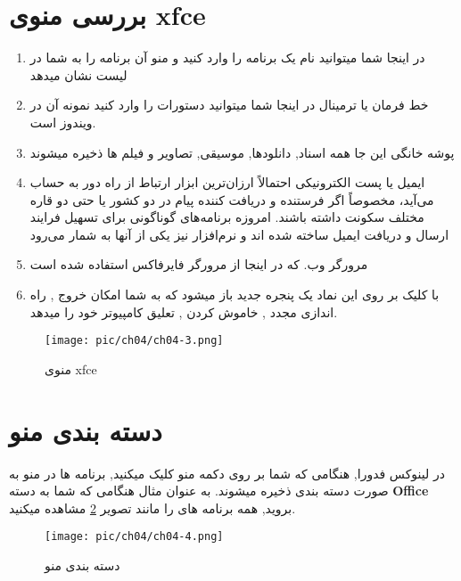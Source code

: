 \section{بررسی منوی xfce}\label{se-33}
\begin{enumerate}
	\item در اینجا شما میتوانید نام یک برنامه را وارد کنید و منو آن برنامه را به شما در لیست نشان میدهد
	\item خط فرمان یا ترمینال در اینجا شما میتوانید دستورات را وارد کنید نمونه آن در ویندوز
	است.
	\item پوشه خانگی این جا همه اسناد, دانلودها, موسیقی, تصاویر و فیلم ها ذخیره میشوند
	\item ایمیل یا پست الکترونیکی احتمالاً ارزان‌ترین ابزار ارتباط از راه دور به حساب می‌آید، مخصوصاً اگر فرستنده و دریافت کننده پیام در دو کشور یا حتی دو قاره مختلف سکونت داشته باشند. امروزه برنامه‌های گوناگونی برای تسهیل فرایند ارسال و دریافت ایمیل ساخته شده اند و نرم‌افزار 
	 نیز یکی از آنها به شمار می‌رود
	 \cite{mail-reader}
	 \item مرورگر وب. که در اینجا از مرورگر فایرفاکس استفاده شده است
	 \item با کلیک بر روی این نماد یک پنجره جدید باز میشود که به شما امکان خروج
	 , راه اندازی مجدد
	 , خاموش کردن
	 , تعلیق
	  کامپیوتر خود را میدهد.
\end{enumerate}
\begin{figure}[H]%
	\caption{منوی xfce}
	\begin{center}
		\texttt{[image: pic/ch04/ch04-3.png]}
	\end{center}
	\label{pic-19}
\end{figure} 
\section{دسته بندی منو}\label{se-34}
در لینوکس فدورا, هنگامی که شما بر روی دکمه منو کلیک میکنید, برنامه ها در منو به صورت دسته بندی ذخیره میشوند. به عنوان مثال هنگامی که شما به دسته 
\textbf{Office}
بروید, همه برنامه های را مانند تصویر 
\ref{pic-20}
مشاهده میکنید.
\begin{figure}[H]%
	\caption{دسته بندی منو}
	\begin{center}
		\texttt{[image: pic/ch04/ch04-4.png]}
	\end{center}
	\label{pic-20}
\end{figure} 
